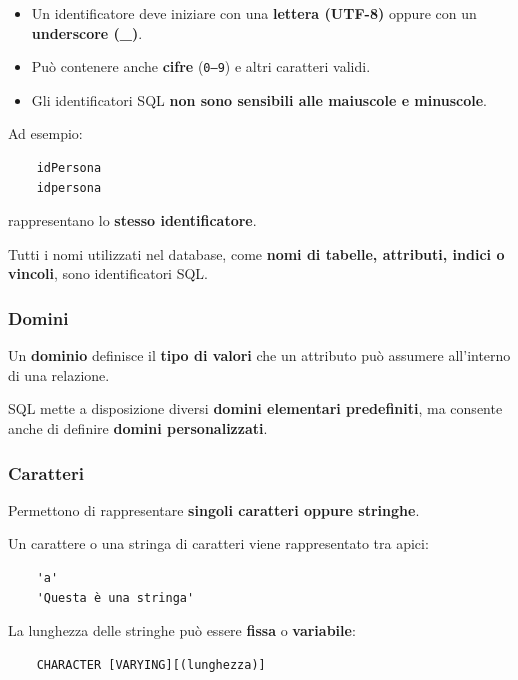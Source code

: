 \begin{itemize}
	
	\item Un identificatore deve iniziare con una \textbf{lettera (UTF-8)} oppure con un \textbf{underscore (\_)}.
	
	\item Può contenere anche \textbf{cifre} (\texttt{0--9}) e altri caratteri validi.
	
	\item Gli identificatori SQL \textbf{non sono sensibili alle maiuscole e minuscole}.
	
\end{itemize}

Ad esempio:

\begin{verbatim}
	idPersona
	idpersona
\end{verbatim}

rappresentano lo \textbf{stesso identificatore}.

Tutti i nomi utilizzati nel database, come \textbf{nomi di tabelle, attributi, indici o vincoli}, sono identificatori SQL.
\subsubsection*{Domini}
Un \textbf{dominio} definisce il \textbf{tipo di valori} che un attributo può assumere all'interno di una relazione.

SQL mette a disposizione diversi \textbf{domini elementari predefiniti}, ma consente anche di definire \textbf{domini personalizzati}.

\subsubsection*{Caratteri}

Permettono di rappresentare \textbf{singoli caratteri oppure stringhe}.

Un carattere o una stringa di caratteri viene rappresentato tra apici:

\begin{verbatim}
	'a'
	'Questa è una stringa'
\end{verbatim}

La lunghezza delle stringhe può essere \textbf{fissa} o \textbf{variabile}:

\begin{verbatim}
	CHARACTER [VARYING][(lunghezza)]
\end{verbatim}


